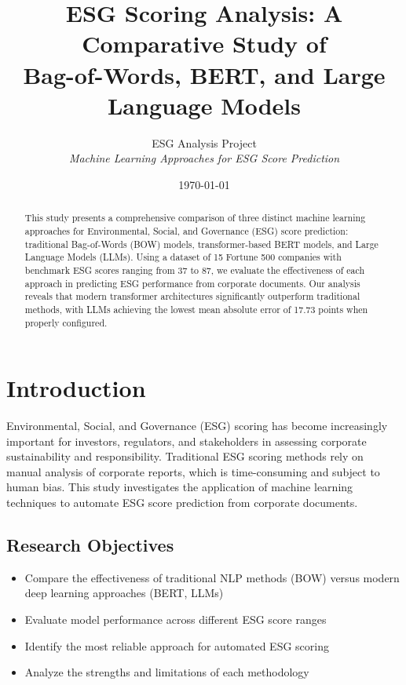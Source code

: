 \documentclass[12pt,a4paper]{article}
\title{
    \textbf{\Large ESG Scoring Analysis: A Comparative Study of \\
    Bag-of-Words, BERT, and Large Language Models}
}
\author{
    ESG Analysis Project \\
    \textit{Machine Learning Approaches for ESG Score Prediction}
}
\date{\today}
\begin{document}
\maketitle
\thispagestyle{empty}

\begin{abstract}
This study presents a comprehensive comparison of three distinct machine learning approaches for Environmental, Social, and Governance (ESG) score prediction: traditional Bag-of-Words (BOW) models, transformer-based BERT models, and Large Language Models (LLMs). Using a dataset of 15 Fortune 500 companies with benchmark ESG scores ranging from 37 to 87, we evaluate the effectiveness of each approach in predicting ESG performance from corporate documents. Our analysis reveals that modern transformer architectures significantly outperform traditional methods, with LLMs achieving the lowest mean absolute error of 17.73 points when properly configured.
\end{abstract}

\tableofcontents
\newpage

\section{Introduction}

Environmental, Social, and Governance (ESG) scoring has become increasingly important for investors, regulators, and stakeholders in assessing corporate sustainability and responsibility. Traditional ESG scoring methods rely on manual analysis of corporate reports, which is time-consuming and subject to human bias. This study investigates the application of machine learning techniques to automate ESG score prediction from corporate documents.

\subsection{Research Objectives}
\begin{itemize}
    \item Compare the effectiveness of traditional NLP methods (BOW) versus modern deep learning approaches (BERT, LLMs)
    \item Evaluate model performance across different ESG score ranges
    \item Identify the most reliable approach for automated ESG scoring
    \item Analyze the strengths and limitations of each methodology
\end{itemize}
\end{document}
